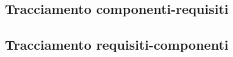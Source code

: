 





\subsection{Tracciamento componenti-requisiti}




\subsection{Tracciamento requisiti-componenti}

